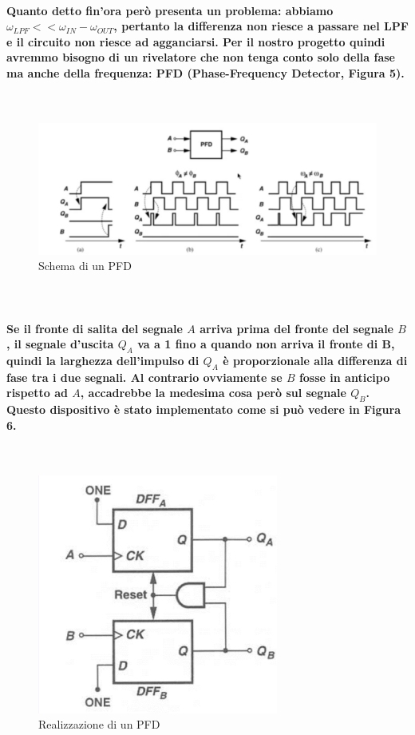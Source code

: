 \documentclass{article}
\begin{document}
\paragraph{Quanto detto fin'ora però presenta un problema: abbiamo\\ $\omega_{LPF}<<\omega_{IN}-\omega_{OUT}$, pertanto la differenza non riesce a passare nel LPF e il circuito non riesce ad agganciarsi. Per il nostro progetto quindi avremmo bisogno di un rivelatore che non tenga conto solo della fase ma anche della frequenza: PFD (Phase-Frequency Detector, Figura 5).}
~\begin{figure}[!h]%
\includegraphics[scale=0.4]{PFD2.png} 
\centering
\caption{Schema di un PFD}
\label{fig:foo}
\end{figure}
\paragraph{\\\\Se il fronte di salita del segnale $A$ arriva prima del fronte del segnale $B$, il segnale d'uscita $Q_A$ va a 1 fino a quando non arriva il fronte di B, quindi la larghezza dell'impulso di $Q_A$ è proporzionale alla differenza di fase tra i due segnali. Al contrario ovviamente se $B$ fosse in anticipo rispetto ad $A$, accadrebbe la medesima cosa però sul segnale $Q_B$.
Questo dispositivo è stato implementato come si può vedere in Figura 6.
}
~\begin{figure}[!h]%
\includegraphics[scale=0.6]{PFD.png} 
\centering
\caption{Realizzazione di un PFD}
\label{fig:foo}
\end{figure}
\end{document}
